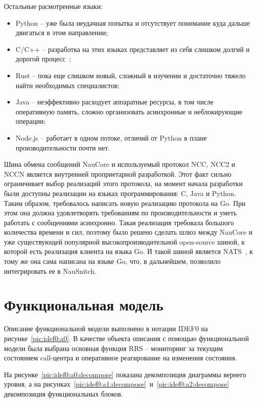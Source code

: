 Остальные расмотренные языки:
\begin{itemize}
    \item Python -- уже была неудачная попытка и отсутствует понимание куда дальше двигаться в этом направлении;
    \item C/C++ -- разработка на этих языках представляет из себя слишком долгий и дорогой процесс~\cite{Goinyandex};
    \item Rust -- пока еще слишком новый, сложный в изучении и достаточно тяжело найти необходимых специалистов;
    \item Java -- неэффективно расходует аппаратные ресурсы, в том числе оперативную память,
    сложно организовать асинхронные и неблокирующие операции;
    \item Node.js -- работает в одном потоке, отличий от Python в плане производительности почти нет.
\end{itemize}

Шина обмена сообщений NauCore и используемый протокол NCC, NCC2 и NCCN является
внутренней проприетарной разработкой.
Этот факт сильно ограничивает выбор реализаций этого протокола,
на момент начала разработки были доступны реализации на языках программирования: C, Java и Python.
Таким образом, требовалось написать новую реализацию протокола на Go.
При этом она должна удовлетворять требованиям по производительности
и уметь работать с сообщениями асинхронно.
Такая реализация требовала большого количества времени и сил,
поэтому было решено сделать шлюз между NauCore и
уже существующей популярной высокопроизводительной open-source шиной,
к которой есть реализация клиента на языка Go.
И такой шиной является NATS~\cite{AboutNATS}, к тому же она сама написана на языке Go,
что, в дальнейшем, позволило интегрировать ее в NauSnitch.

\section{Функциональная модель}

Описание функциональной модели выполнено в нотации IDEF0 на рисунке~\ref{pic:idef0:a0}.
В качестве объекта описания с помощью функциональной модели была выбрана основная функция RRS --
мониторинг за текущим состоянием call-центра и оперативное реагирование на изменения состояния.

На рисунке~\ref{pic:idef0:a0:decompose} показана декомпозиция диаграммы вернего уровня,
а на рисунках~\ref{pic:idef0:a1:decompose}~и~\ref{pic:idef0:a2:decompose} декомпозиция функциональных блоков.

